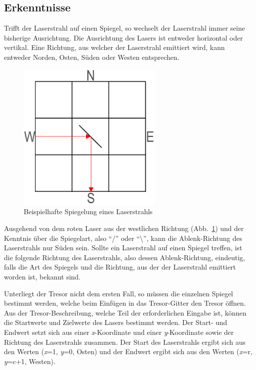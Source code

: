 \subsection{Erkenntnisse}
\label{subsec:TextBefehle}
Trifft der Laserstrahl auf einen Spiegel, so wechselt der Laserstrahl immer seine bisherige Ausrichtung. Die Ausrichtung des Lasers ist entweder horizontal oder vertikal. Eine Richtung, aus welcher der Laserstrahl emittiert wird, kann entweder Norden, Osten, Süden oder Westen entsprechen.
\begin{figure}[h]
    \centering
    \includegraphics[width=7cm]{Bilder2/Abb3.PNG}
    \caption{Beispielhafte Spiegelung eines Laserstrahls}
    \label{fig:enter-label3}
\end{figure}

Ausgehend von dem roten Laser aus der westlichen Richtung (Abb.~\ref{fig:enter-label3}) und der Kenntnis über die Spiegelart, also “\slash” oder “\textbackslash”, kann die Ablenk-Richtung des Laserstrahls nur Süden sein. Sollte ein Laserstrahl auf einen Spiegel treffen, ist die folgende Richtung des Laserstrahls, also dessen Ablenk-Richtung, eindeutig, falls die Art des Spiegels und die Richtung, aus der der Laserstrahl emittiert worden ist, bekannt sind. 

Unterliegt der Tresor nicht dem ersten Fall, so müssen die einzelnen Spiegel bestimmt werden, welche beim Einfügen in das Tresor-Gitter den Tresor öffnen. Aus der Tresor-Beschreibung, welche Teil der erforderlichen Eingabe ist, können die Startwerte und Zielwerte des Lasers bestimmt werden. Der Start- und Endwert setzt sich aus einer \textit{x}-Koordinate und einer \textit{y}-Koordinate sowie der Richtung des Laserstrahls zusammen. Der Start des Laserstrahls ergibt sich aus den Werten (\textit{x}=1, \textit{y}=0, Osten) und der Endwert ergibt sich aus den Werten (\textit{x}=r, \textit{y}=c+1, Westen).

